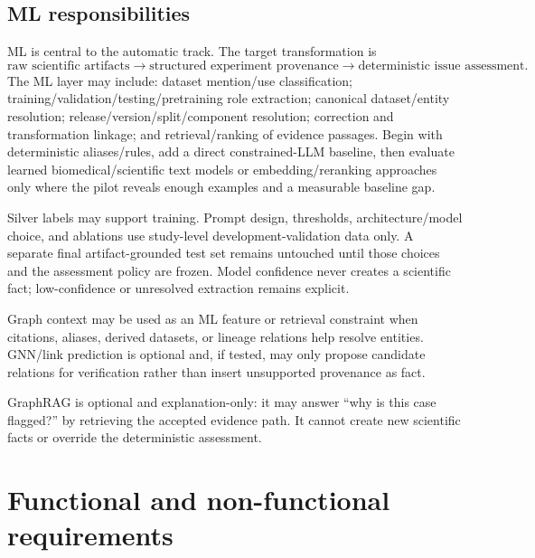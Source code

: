 \documentclass[11pt,a4paper]{article}
\begin{document}
\subsection{ML responsibilities}
ML is central to the automatic track. The target transformation is
\[
\text{raw scientific artifacts}\rightarrow\text{structured experiment provenance}\rightarrow\text{deterministic issue assessment}.
\]
The ML layer may include: dataset mention/use classification; training/validation/testing/pretraining role extraction; canonical dataset/entity resolution; release/version/split/component resolution; correction and transformation linkage; and retrieval/ranking of evidence passages. Begin with deterministic aliases/rules, add a direct constrained-LLM baseline, then evaluate learned biomedical/scientific text models or embedding/reranking approaches only where the pilot reveals enough examples and a measurable baseline gap.

Silver labels may support training. Prompt design, thresholds, architecture/model choice, and ablations use study-level development-validation data only. A separate final artifact-grounded test set remains untouched until those choices and the assessment policy are frozen. Model confidence never creates a scientific fact; low-confidence or unresolved extraction remains explicit.

Graph context may be used as an ML feature or retrieval constraint when citations, aliases, derived datasets, or lineage relations help resolve entities. GNN/link prediction is optional and, if tested, may only propose candidate relations for verification rather than insert unsupported provenance as fact.

GraphRAG is optional and explanation-only: it may answer ``why is this case flagged?'' by retrieving the accepted evidence path. It cannot create new scientific facts or override the deterministic assessment.

\section{Functional and non-functional requirements}
\label{sec:reqs}
\end{document}
